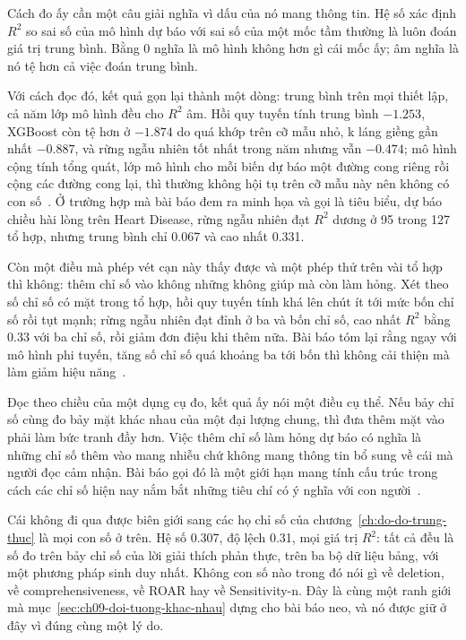 Cách đo ấy cần một câu giải nghĩa vì dấu của nó mang thông tin. Hệ số xác định
$R^2$ so sai số của mô hình dự báo với sai số của một mốc tầm thường là luôn
đoán giá trị trung bình. Bằng 0 nghĩa là mô hình không hơn gì cái mốc ấy; âm
nghĩa là nó tệ hơn cả việc đoán trung bình.

Với cách đọc đó, kết quả gọn lại thành một dòng: trung bình trên mọi thiết
lập, cả năm lớp mô hình đều cho $R^2$ âm. Hồi quy tuyến tính trung bình
$-1.253$, XGBoost còn tệ hơn ở $-1.874$ do quá khớp trên cỡ mẫu nhỏ, k láng
giềng gần nhất $-0.887$, và rừng ngẫu nhiên tốt nhất trong năm nhưng vẫn
$-0.474$; mô hình cộng tính tổng quát, lớp mô hình cho mỗi biến dự báo một
đường cong riêng rồi cộng các đường cong lại, thì thường không hội tụ trên cỡ
mẫu này nên không có con số~\autocite{p25userperception}. Ở trường hợp mà bài
báo đem ra minh họa và gọi là tiêu biểu, dự báo chiều hài lòng trên Heart
Disease, rừng ngẫu nhiên đạt $R^2$
dương ở 95 trong 127 tổ hợp, nhưng trung bình chỉ 0.067 và cao nhất 0.331.

Còn một điều mà phép vét cạn này thấy được và một phép thử trên vài tổ hợp thì
không: thêm chỉ số vào không những không giúp mà còn làm hỏng. Xét theo số chỉ
số có mặt trong tổ hợp, hồi quy tuyến tính khá lên chút ít tới mức bốn chỉ số
rồi tụt mạnh; rừng ngẫu nhiên đạt đỉnh ở ba và bốn chỉ số, cao nhất $R^2$ bằng
0.33 với ba chỉ số, rồi giảm đơn điệu khi thêm nữa. Bài báo tóm lại rằng ngay
với mô hình phi tuyến, tăng số chỉ số quá khoảng ba tới bốn thì không cải
thiện mà làm giảm hiệu năng~\autocite{p25userperception}.

Đọc theo chiều của một dụng cụ đo, kết quả ấy nói một điều cụ thể. Nếu bảy chỉ
số cùng đo bảy mặt khác nhau của một đại lượng chung, thì đưa thêm mặt vào
phải làm bức tranh đầy hơn. Việc thêm chỉ số làm hỏng dự báo có nghĩa là những
chỉ số thêm vào mang nhiễu chứ không mang thông tin bổ sung về cái mà người
đọc cảm nhận. Bài báo gọi đó là một giới hạn mang tính cấu trúc trong cách các
chỉ số hiện nay nắm bắt những tiêu chí có ý nghĩa với con
người~\autocite{p25userperception}.

%
Cái không đi qua được biên giới sang các họ chỉ số của
chương~\ref{ch:do-do-trung-thuc} là mọi con số ở trên. Hệ số 0.307, độ
lệch 0.31, mọi giá trị $R^2$: tất cả đều là số đo trên bảy chỉ số của lời giải
thích phản thực, trên ba bộ dữ liệu bảng, với một phương pháp sinh duy nhất.
Không con số nào trong đó nói gì về deletion, về comprehensiveness, về ROAR
hay về Sensitivity-n. Đây là cùng một ranh giới mà
mục~\ref{sec:ch09-doi-tuong-khac-nhau} dựng cho bài báo neo, và nó được giữ ở
đây vì đúng cùng một lý do.

